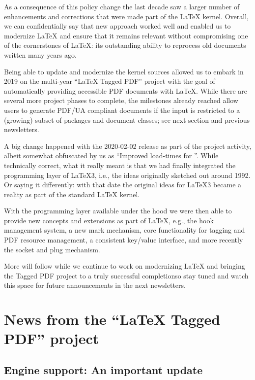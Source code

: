 \documentclass{ltnews}
\providecommand\Dash {\unskip \textemdash}
\begin{document}
As a consequence of this policy change the last decade saw a larger
number of enhancements and corrections that were made part of the
\LaTeX{} kernel. Overall, we can confidentially say that new
approach worked well and enabled us to modernize \LaTeX{} and ensure
that it remains relevant without compromising one of the cornerstones
of \LaTeX{}: its outstanding ability to reprocess old documents
written many years ago.

Being able to update and modernize the kernel sources allowed us to
embark in 2019 on the multi-year \enquote{\LaTeX{} Tagged PDF} project
with the goal of automatically providing accessible PDF documents with
\LaTeX{}. While there are several more project phases to complete, the
milestones already reached allow users to generate PDF/UA compliant
documents if the input is restricted to a (growing) subset of packages
and document classes; see next section and previous newsletters.

 A big change happened with the 2020-02-02 release as part of the project activity,
 albeit somewhat obfuscated by us as \enquote{Improved load-times for
   }. While technically correct, what it really meant is
 that we had finally integrated the programming layer of \LaTeX3,
 i.e., the ideas originally sketched out around 1992.  Or saying it
 differently: with that date the original ideas for \LaTeX3 became a
 reality as part of the standard \LaTeX{} kernel.

 With the programming layer available under the hood we were then able to
 provide new concepts and extensions as part of \LaTeX{},
 e.g., the hook management system, a new mark mechanism, core
 functionality for tagging and PDF resource management, a consistent
 key/value interface, and more recently the socket and plug mechanism.

 More will follow while we continue to work on modernizing \LaTeX{} and
 bringing the Tagged PDF project to a truly successful completion\Dash so
 stay tuned and watch this space for future announcements in the next
 newsletters.

 

\section{News from the \enquote{\LaTeX{} Tagged PDF} project}

\subsection{Engine support: An important update}
\end{document}
